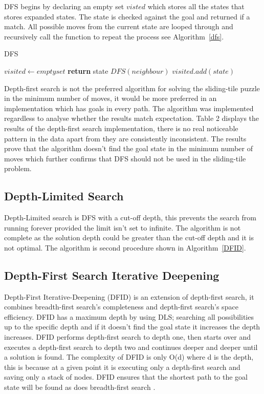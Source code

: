 \documentclass[final]{cmpreport}
\begin{document}
DFS begins by declaring an empty set $visted$ which stores all the states that stores expanded states. The state is checked against the goal and returned if a match. All possible moves from the current state are looped through and recursively call the function to repeat the process see Algorithm~\ref{dfs}.
\begin{algorithm}
	\caption{DFS}\label{dfs}
	\begin{algorithmic}[1]
		\State $visited \gets empty set$
		\State \textbf{return} state
		\EndIf
		\State	$DFS(neighbour)$
		\EndIf
		\EndFor
		\State $visited.add(state)$
		\EndProcedure
	\end{algorithmic}
\end{algorithm}


Depth-first search is not the preferred algorithm for solving the sliding-tile puzzle in the minimum number of moves, it would be more preferred in an implementation which has goals in every path. The algorithm was implemented regardless to analyse whether the results match expectation. Table 2 displays the results of the depth-first search implementation, there is no real noticeable pattern in the data apart from they are consistently inconsistent. The results prove that the algorithm doesn't find the goal state in the minimum number of moves which further confirms that DFS should not be used in the sliding-tile problem. 

\subsection{Depth-Limited Search}
Depth-Limited search is DFS with a cut-off depth, this prevents the search from running forever provided the limit isn't set to infinite. The algorithm is not complete as the solution depth could be greater than the cut-off depth and it is not optimal. The algorithm is second procedure shown in Algorithm~\ref{DFID}.


  
\subsection{Depth-First Search Iterative Deepening}
Depth-First Iterative-Deepening (DFID) is an extension of depth-first search, it combines breadth-first search's completeness and depth-first search's space efficiency. DFID has a maximum depth by using DLS; searching all possibilities up to the specific depth and if it doesn't find the goal state it increases the depth increases. DFID performs depth-first search to depth one, then starts over and executes a depth-first search to depth two and continues deeper and deeper until a solution is found. The complexity of DFID is only O(d) where d is the depth, this is because at a given point it is executing only a depth-first search and saving only a stack of nodes. DFID ensures that the shortest path to the goal state will be found as does breadth-first search \citep{DBLP:conf/otm/MeissnerB11}.
\end{document}
